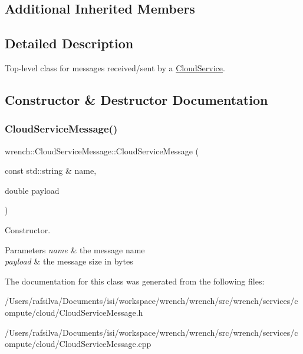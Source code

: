 \subsection*{Additional Inherited Members}


\subsection{Detailed Description}
Top-\/level class for messages received/sent by a \hyperlink{classwrench_1_1_cloud_service}{Cloud\+Service}. 

\subsection{Constructor \& Destructor Documentation}
\mbox{\label{classwrench_1_1_cloud_service_message_a6092eea84d989b5ff4df06db6db5927d}} 
\subsubsection{\texorpdfstring{Cloud\+Service\+Message()}{CloudServiceMessage()}}
{\footnotesize\ttfamily wrench\+::\+Cloud\+Service\+Message\+::\+Cloud\+Service\+Message (\begin{DoxyParamCaption}\item[{const std\+::string \&}]{name,  }\item[{double}]{payload }\end{DoxyParamCaption})\hspace{0.3cm}{\ttfamily [protected]}}



Constructor. 


\begin{DoxyParams}{Parameters}
{\em name} & the message name \\
\hline
{\em payload} & the message size in bytes \\
\hline
\end{DoxyParams}


The documentation for this class was generated from the following files\+:\begin{DoxyCompactItemize}
\item 
/\+Users/rafsilva/\+Documents/isi/workspace/wrench/wrench/src/wrench/services/compute/cloud/Cloud\+Service\+Message.\+h\item 
/\+Users/rafsilva/\+Documents/isi/workspace/wrench/wrench/src/wrench/services/compute/cloud/Cloud\+Service\+Message.\+cpp\end{DoxyCompactItemize}

